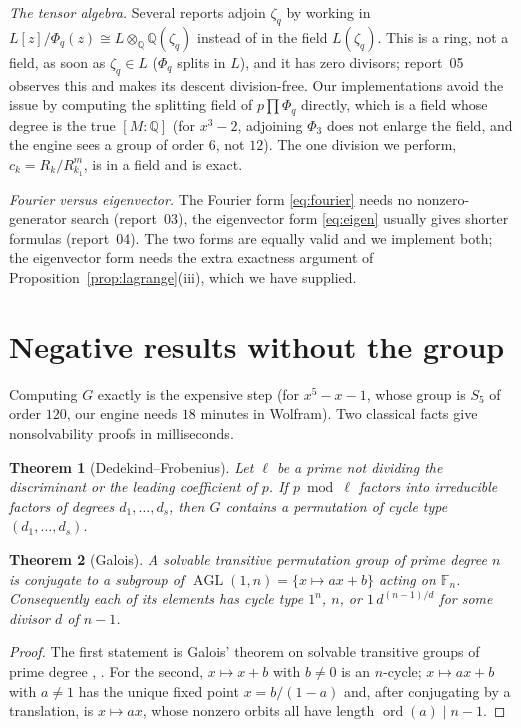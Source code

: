 \documentclass[11pt,a4paper]{article}
\newtheorem{theorem}{Theorem}[section]
\theoremstyle{definition}
\theoremstyle{remark}
\newcommand{\Q}{\mathbb{Q}}
\newcommand{\F}{\mathbb{F}}
\newcommand{\AGL}{\operatorname{AGL}}
\begin{document}
\emph{The tensor algebra.}  Several reports adjoin $\zeta_q$ by working in
$L[z]/\Phi_q(z)\cong L\otimes_\Q\Q(\zeta_q)$ instead of in the field $L(\zeta_q)$.  This
is a ring, not a field, as soon as $\zeta_q\in L$ ($\Phi_q$ splits in $L$), and it has
zero divisors; report~05 observes this and makes its descent division-free.  Our
implementations avoid the issue by computing the splitting field of $p\prod\Phi_q$
directly, which is a field whose degree is the true $[M:\Q]$ (for $x^3-2$, adjoining
$\Phi_3$ does not enlarge the field, and the engine sees a group of order $6$, not $12$).
The one division we perform, $c_k=R_k/R_{k_1}^m$, is in a field and is exact.

\emph{Fourier versus eigenvector.}  The Fourier form \eqref{eq:fourier} needs no
nonzero-generator search (report~03), the eigenvector form \eqref{eq:eigen} usually
gives shorter formulas (report~04).  The two forms are equally valid and we implement
both; the eigenvector form needs the extra exactness argument of
Proposition~\ref{prop:lagrange}(iii), which we have supplied.

\section{Negative results without the group}\label{sec:negative}

Computing $G$ exactly is the expensive step (for $x^5-x-1$, whose group is $S_5$ of
order $120$, our engine needs $18$ minutes in Wolfram).  Two classical facts give
nonsolvability proofs in milliseconds.

\begin{theorem}[Dedekind--Frobenius]\label{thm:frobenius}
Let $\ell$ be a prime not dividing the discriminant or the leading coefficient of $p$.
If $p\bmod\ell$ factors into irreducible factors of degrees $d_1,\dots,d_s$, then $G$
contains a permutation of cycle type $(d_1,\dots,d_s)$.
\end{theorem}

\begin{theorem}[Galois]\label{thm:agl}
A solvable transitive permutation group of prime degree $n$ is conjugate to a subgroup
of $\AGL(1,n)=\{x\mapsto ax+b\}$ acting on $\F_n$.  Consequently each of its elements has
cycle type $1^n$, $n$, or $1\,d^{(n-1)/d}$ for some divisor $d$ of $n-1$.
\end{theorem}

\begin{proof}
The first statement is Galois' theorem on solvable transitive groups of prime degree
\cite[Chapter 4]{Milne}, \cite[\S 14.7]{DummitFoote}.  For the second, $x\mapsto x+b$ with
$b\ne0$ is an $n$-cycle; $x\mapsto ax+b$ with $a\ne1$ has the unique fixed point
$x=b/(1-a)$ and, after conjugating by a translation, is $x\mapsto ax$, whose nonzero
orbits all have length $\operatorname{ord}(a)\mid n-1$.
\end{proof}
\end{document}
